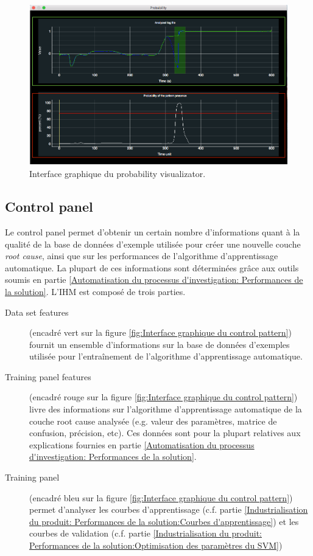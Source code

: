 \begin{figure}[h]
	\centering\includegraphics[height=7cm]{images/proba_visu.png}
	\caption[Interface graphique du probability visualizator]{Interface graphique du probability visualizator.}
	\label{fig:Interface graphique du probability visualizator}
\end{figure}

\subsection{Control panel}
\label{Industrialisation du produit: Outils graphiques: Control panel}
Le control panel permet d'obtenir un certain nombre d'informations quant à la qualité de la base de données d'exemple utilisée pour créer une nouvelle couche \emph{root cause}, ainsi que sur les performances de l'algorithme d'apprentissage automatique. La plupart de ces informations sont déterminées grâce aux outils soumis en partie \ref{Automatisation du processus d'investigation: Performances de la solution}. L'IHM est composé de trois parties.
\begin{description}
	\item [Data set features] (encadré vert sur la figure \ref{fig:Interface graphique du control pattern}) fournit un ensemble d'informations sur la base de données d'exemples utilisée pour l'entraînement de l'algorithme d'apprentissage automatique. 
	\item [Training panel features ](encadré rouge sur la figure \ref{fig:Interface graphique du control pattern})  livre des informations sur l'algorithme d'apprentissage automatique de la couche root cause analysée (e.g. valeur des paramètres, matrice de confusion, précision, etc). Ces données sont pour la plupart relatives aux explications fournies en partie \ref{Automatisation du processus d'investigation: Performances de la solution}.
	\item [Training panel ](encadré bleu sur la figure \ref{fig:Interface graphique du control pattern}) permet d'analyser les courbes d'apprentissage (c.f. partie \ref{Industrialisation du produit: Performances de la solution:Courbes d'apprentissage}) et les courbes de validation (c.f. partie \ref{Industrialisation du produit: Performances de la solution:Optimisation des paramètres du SVM})
\end{description}

